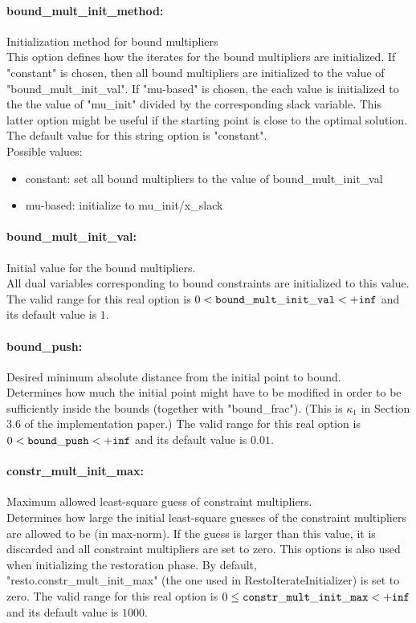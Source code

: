\paragraph{bound\_mult\_init\_method:}\label{sec:bound_mult_init_method} Initialization method for bound multipliers $\;$ \\
 This option defines how the iterates for the
bound multipliers are initialized.  If "constant"
is chosen, then all bound multipliers are
initialized to the value of
"bound\_mult\_init\_val".  If "mu-based" is
chosen, the each value is initialized to the the
value of "mu\_init" divided by the corresponding
slack variable.  This latter option might be
useful if the starting point is close to the
optimal solution.
The default value for this string option is "constant".
\\ 
Possible values:
\begin{itemize}
   \item constant: set all bound multipliers to the value of
bound\_mult\_init\_val
   \item mu-based: initialize to mu\_init/x\_slack
\end{itemize}

\paragraph{bound\_mult\_init\_val:}\label{sec:bound_mult_init_val} Initial value for the bound multipliers. $\;$ \\
 All dual variables corresponding to bound
constraints are initialized to this value. The valid range for this real option is 
$0 <  {\tt bound\_mult\_init\_val } <  {\tt +inf}$
and its default value is $1$.


\paragraph{bound\_push:}\label{sec:bound_push} Desired minimum absolute distance from the initial point to bound. $\;$ \\
 Determines how much the initial point might have
to be modified in order to be sufficiently inside
the bounds (together with "bound\_frac").  (This
is $\kappa_1$ in Section 3.6 of the implementation
paper.) The valid range for this real option is 
$0 <  {\tt bound\_push } <  {\tt +inf}$
and its default value is $0.01$.


\paragraph{constr\_mult\_init\_max:}\label{sec:constr_mult_init_max} Maximum allowed least-square guess of constraint multipliers. $\;$ \\
 Determines how large the initial least-square
guesses of the constraint multipliers are allowed
to be (in max-norm). If the guess is larger than
this value, it is discarded and all constraint
multipliers are set to zero.  This options is
also used when initializing the restoration
phase. By default,
"resto.constr\_mult\_init\_max" (the one used in
RestoIterateInitializer) is set to zero. The valid range for this real option is 
$0 \le {\tt constr\_mult\_init\_max } <  {\tt +inf}$
and its default value is $1000$.


